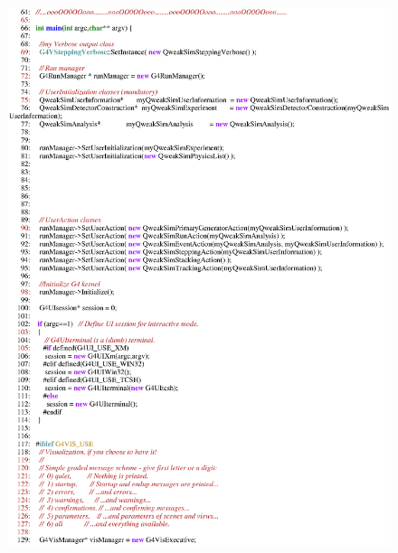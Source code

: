 \begin{figure}[h]
  \hspace{0cm}
  \includegraphics[scale=0.8]{./figures3/QweakSimG4-p2.eps}
  \caption{}
           \label{fig:MAIN1}
\end{figure}

